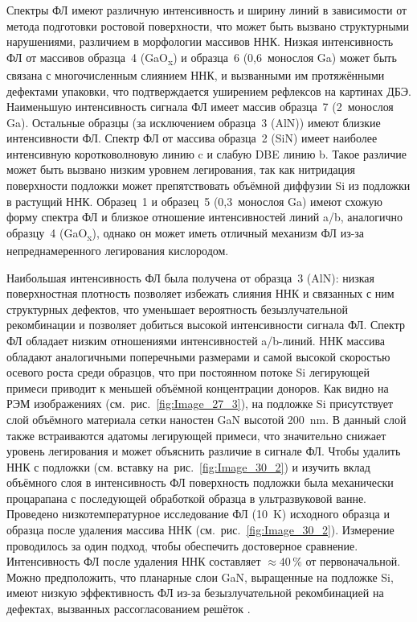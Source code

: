 Спектры ФЛ имеют различную интенсивность и ширину линий в зависимости от метода
подготовки ростовой поверхности, что может быть вызвано структурными
нарушениями, различием в морфологии массивов ННК. Низкая интенсивность ФЛ от
массивов образца~4 (GaO\textsubscript{x}) и образца~6 (0,6~монослоя Ga) может
быть связана с многочисленным слиянием ННК, и вызванными им протяжёнными
дефектами упаковки, что подтверждается уширением рефлексов на картинах ДБЭ.
Наименьшую интенсивность сигнала ФЛ имеет массив образца~7 (2~монослоя Ga).
Остальные образцы (за исключением образца~3 (AlN)) имеют близкие интенсивности
ФЛ. Спектр ФЛ от массива образца~2 (SiN) имеет наиболее интенсивную
коротковолновую линию c и слабую DBE линию b. Такое различие может быть вызвано
низким уровнем легирования, так как нитридация поверхности подложки может
препятствовать объёмной диффузии Si из подложки в растущий ННК. Образец~1 и
образец~5 (0,3~монослоя Ga) имеют схожую форму спектра ФЛ и близкое отношение
интенсивностей линий a/b, аналогично образцу~4 (GaO\textsubscript{x}), однако
он может иметь отличный механизм ФЛ из-за непреднамеренного легирования
кислородом.

Наибольшая интенсивность ФЛ была получена от образца~3 (AlN): низкая
поверхностная плотность позволяет избежать слияния ННК и связанных с ним
структурных дефектов, что уменьшает вероятность безызлучательной рекомбинации и
позволяет добиться высокой интенсивности сигнала ФЛ. Спектр ФЛ обладает низким
отношениями интенсивностей a/b-линий. ННК массива обладают аналогичными
поперечными размерами и самой высокой скоростью осевого роста среди образцов,
что при постоянном потоке Si легирующей примеси приводит к меньшей объёмной
концентрации доноров. Как видно на РЭМ изображениях
(см.~рис.~\cref{fig:Image_27_3}), на подложке Si присутствует слой объёмного
материала сетки наностен GaN высотой 200~\si{\nano\meter}. В данный слой также
встраиваются адатомы легирующей примеси, что значительно снижает уровень
легирования и может объяснить различие в сигнале ФЛ. Чтобы удалить ННК с
подложки (см. вставку на~рис.~\cref{fig:Image_30_2}) и изучить вклад объёмного
слоя в интенсивность ФЛ поверхность подложки была механически процарапана с
последующей обработкой образца в ультразвуковой ванне. Проведено
низкотемпературное исследование ФЛ (10~\si{\kelvin}) исходного образца и
образца после удаления массива ННК (см.~рис.~\cref{fig:Image_30_2}). Измерение
проводилось за один подход, чтобы обеспечить достоверное сравнение.
Интенсивность ФЛ после удаления ННК составляет \(\approx 40\,\%\) от
первоначальной. Можно предположить, что планарные слои GaN, выращенные на
подложке Si, имеют низкую эффективность ФЛ из-за безызлучательной рекомбинацией
на дефектах, вызванных рассогласованием решёток \cite{Calleja1999,
Reshchikov2005}.


